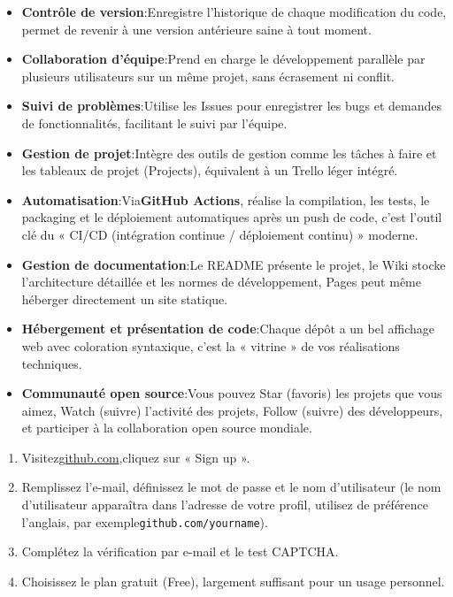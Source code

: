 \begin{itemize}
  \item \textbf{Contrôle de version}:Enregistre l’historique de chaque modification du code, permet de revenir à une version antérieure saine à tout moment.
  \item \textbf{Collaboration d’équipe}:Prend en charge le développement parallèle par plusieurs utilisateurs sur un même projet, sans écrasement ni conflit.
  \item \textbf{Suivi de problèmes}:Utilise les Issues pour enregistrer les bugs et demandes de fonctionnalités, facilitant le suivi par l’équipe.
  \item \textbf{Gestion de projet}:Intègre des outils de gestion comme les tâches à faire et les tableaux de projet (Projects), équivalent à un Trello léger intégré.
  \item \textbf{Automatisation}:Via\textbf{GitHub Actions}, réalise la compilation, les tests, le packaging et le déploiement automatiques après un push de code, c’est l’outil clé du « CI/CD (intégration continue / déploiement continu) » moderne.
  \item \textbf{Gestion de documentation}:Le README présente le projet, le Wiki stocke l’architecture détaillée et les normes de développement, Pages peut même héberger directement un site statique.
  \item \textbf{Hébergement et présentation de code}:Chaque dépôt a un bel affichage web avec coloration syntaxique, c’est la « vitrine » de vos réalisations techniques.
  \item \textbf{Communauté open source}:Vous pouvez Star (favoris) les projets que vous aimez, Watch (suivre) l’activité des projets, Follow (suivre) des développeurs, et participer à la collaboration open source mondiale.
\end{itemize}



\begin{enumerate}
  \item Visitez\href{https://github.com}{github.com},cliquez sur « Sign up ».
  \item Remplissez l'e-mail, définissez le mot de passe et le nom d'utilisateur (le nom d'utilisateur apparaîtra dans l'adresse de votre profil, utilisez de préférence l'anglais, par exemple\texttt{github.\allowbreak com/\allowbreak yourname}).
  \item Complétez la vérification par e-mail et le test CAPTCHA.
  \item Choisissez le plan gratuit (Free), largement suffisant pour un usage personnel.
\end{enumerate}

